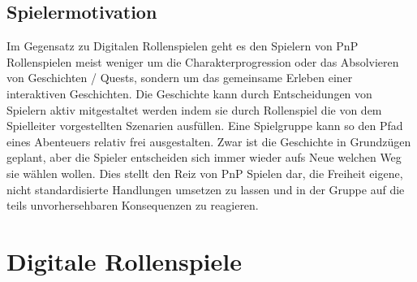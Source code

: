 \subsection{Spielermotivation}
\label{sec:Spielermotivation}

Im Gegensatz zu Digitalen Rollenspielen geht es den Spielern von PnP Rollenspielen meist weniger um die Charakterprogression oder das Absolvieren von Geschichten / Quests, sondern um das gemeinsame Erleben einer interaktiven Geschichten. Die Geschichte kann durch Entscheidungen von Spielern aktiv mitgestaltet werden indem sie durch Rollenspiel die von dem Spielleiter vorgestellten Szenarien ausfüllen. Eine Spielgruppe kann so den Pfad eines Abenteuers relativ frei ausgestalten. Zwar ist die Geschichte in Grundzügen geplant, aber die Spieler entscheiden sich immer wieder aufs Neue welchen Weg sie wählen wollen. \cite{Arinbjarnar}
Dies stellt den Reiz von PnP Spielen dar, die Freiheit eigene, nicht standardisierte Handlungen umsetzen zu lassen und in der Gruppe auf die teils unvorhersehbaren Konsequenzen zu reagieren.

\section{Digitale Rollenspiele}
\label{sec:DigitaleRollenspiele}
%

